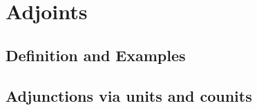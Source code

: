 \chapter{Adjoints}



\section{Definition and Examples}
\addtocounter{subsection}{11}










\section{Adjunctions via units and counits}
\addtocounter{subsection}{9}


